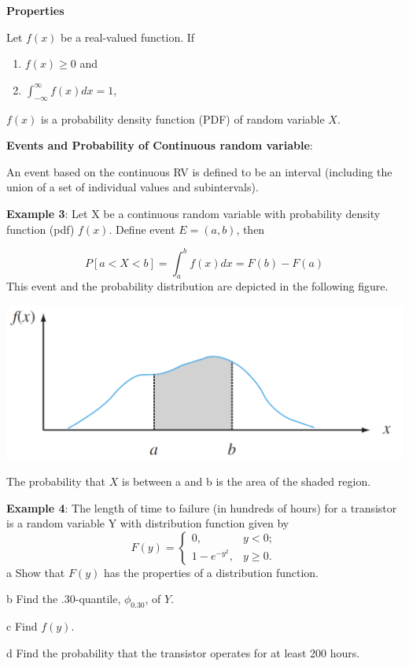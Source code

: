 \documentclass[
]{book}
\begin{document}
\textbf{Properties}

Let \(f(x)\) be a real-valued function. If

\begin{enumerate}
\def\labelenumi{\arabic{enumi}.}
\item
  \(f(x) \ge 0\) and
\item
  \(\int_{-\infty}^\infty f(x) dx = 1\),
\end{enumerate}

\(f(x)\) is a probability density function (PDF) of random variable \(X\).

\textbf{Events and Probability of Continuous random variable}:

An event based on the continuous RV is defined to be an interval (including the union of a set of individual values and subintervals).

\textbf{Example 3}: Let X be a continuous random variable with probability density function (pdf) \(f(x)\). Define event \(E = (a, b)\), then

\[
P[a < X < b] = \int_a^b f(x)dx = F(b) - F(a)
\]
This event and the probability distribution are depicted in the following figure.

\begin{center}\includegraphics[width=0.6\linewidth]{topic03/ContRVevent} \end{center}

The probability that \(X\) is between a and b is the area of the shaded region.

\textbf{Example 4}: The length of time to failure (in hundreds of hours) for a transistor is a random variable Y with distribution function given by
\[
\displaystyle F(y) = \begin{cases} 
 0,  & y < 0 ;   \\  
 1-e^{-y^2},    & y \ge 0.
 \end{cases}
\]
a Show that \(F(y)\) has the properties of a distribution function.

b Find the \(.30\)-quantile, \(\phi_{0.30}\), of \(Y\).

c Find \(f(y)\).

d Find the probability that the transistor operates for at least 200 hours.
\end{document}
